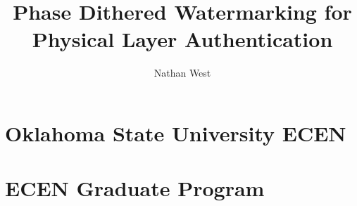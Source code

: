 \documentclass[12pt]{okstate-thesis}
\title{Phase Dithered Watermarking for Physical Layer Authentication}
\author{Nathan West}
\begin{document}
\maketitle
{} %
\begin{acknowledge}
    
\end{acknowledge}
\begin{abstract} %
    
\end{abstract}
\tableofcontents
\listoftables
\listoffigures

%	

\chapter{Oklahoma State University ECEN}

\chapter{ECEN Graduate Program}

%
\nocite{*} %

\appendix


\end{document}
